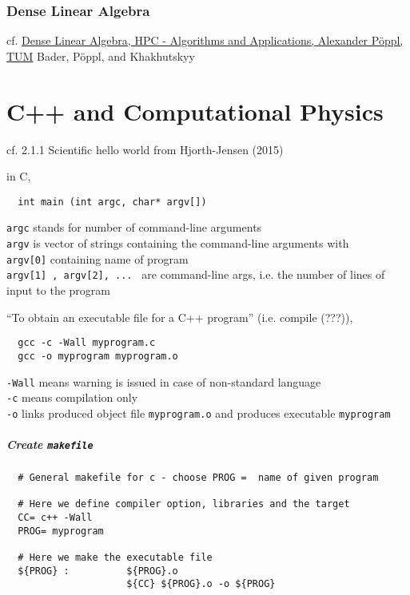 \documentclass[10pt]{amsart}
\begin{document}
\begin{multicols*}{2}
\section{Dense Linear Algebra}
cf. \href{https://www5.in.tum.de/lehre/vorlesungen/hpc/WS16/tutorial/sparse_02.pdf}{Dense Linear Algebra, HPC - Algorithms and Applications, Alexander P\"oppl, TUM}
Bader, P\"{o}ppl, and Khakhutskyy \cite{BaPK2016}




\part{C++ and Computational Physics}

cf. 2.1.1 Scientific hello world from Hjorth-Jensen (2015) \cite{Hjor2015}

in C, 
\begin{lstlisting}
  int main (int argc, char* argv[])
\end{lstlisting}
\verb|argc| stands for number of command-line arguments \\
\verb|argv| is vector of strings containing the command-line arguments with \\
\phantom{argv} \verb|argv[0]| containing name of program \\
\phantom{argv} \verb|argv[1] , argv[2], ... | are command-line args, i.e. the number of lines of input to the program

``To obtain an executable file for a C++ program'' (i.e. compile (???)), 
\begin{lstlisting}
  gcc -c -Wall myprogram.c
  gcc -o myprogram myprogram.o
\end{lstlisting}
\verb|-Wall| means warning is issued in case of non-standard language \\
\verb|-c| means compilation only \\
\verb|-o| links produced object file \verb|myprogram.o| and produces executable \verb|myprogram|

\subsubsection{Create \verb|makefile|}

\begin{lstlisting}
  # General makefile for c - choose PROG =  name of given program
  
  # Here we define compiler option, libraries and the target
  CC= c++ -Wall
  PROG= myprogram

  # Here we make the executable file
  ${PROG} :          ${PROG}.o
                     ${CC} ${PROG}.o -o ${PROG}


\end{lstlisting}
\end{multicols*}
\end{document}
